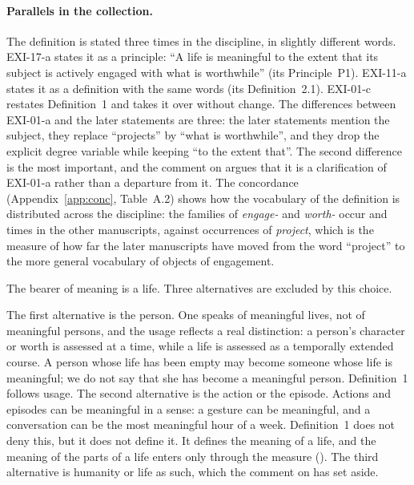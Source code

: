 \paragraph{Parallels in the collection.} The definition is stated three times in the discipline, in slightly different words. EXI-17-a states it as a principle: \enquote{A life is meaningful to the extent that its subject is actively engaged with what is worthwhile} (its Principle~P1). EXI-11-a states it as a definition with the same words (its Definition~2.1). EXI-01-c restates Definition~1 and takes it over without change. The differences between EXI-01-a and the later statements are three: the later statements mention the subject, they replace \enquote{projects} by \enquote{what is worthwhile}, and they drop the explicit degree variable while keeping \enquote{to the extent that}. The second difference is the most important, and the comment on  argues that it is a clarification of EXI-01-a rather than a departure from it. The concordance (Appendix~\ref{app:conc}, Table~A.2) shows how the vocabulary of the definition is distributed across the discipline: the families of \emph{engage-} and \emph{worth-} occur \cnFamengag{} and \cnFamworth{} times in the other manuscripts, against \cnFamproject{} occurrences of \emph{project}, which is the measure of how far the later manuscripts have moved from the word \enquote{project} to the more general vocabulary of objects of engagement.


The bearer of meaning is a life. Three alternatives are excluded by this choice.

The first alternative is the person. One speaks of meaningful lives, not of meaningful persons, and the usage reflects a real distinction: a person's character or worth is assessed at a time, while a life is assessed as a temporally extended course. A person whose life has been empty may become someone whose life is meaningful; we do not say that she has become a meaningful person. Definition~1 follows usage. The second alternative is the action or the episode. Actions and episodes can be meaningful in a sense: a gesture can be meaningful, and a conversation can be the most meaningful hour of a week. Definition~1 does not deny this, but it does not define it. It defines the meaning of a life, and the meaning of the parts of a life enters only through the measure (). The third alternative is humanity or life as such, which the comment on  has set aside.

